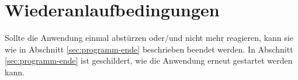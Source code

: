 
\section{Wiederanlaufbedingungen}
\label{sec:wiederanlaufbedingungen}

Sollte die Anwendung einmal abstürzen oder/und nicht mehr reagieren, kann sie wie in Abschnitt \ref{sec:programm-ende} beschrieben beendet werden.
In Abschnitt \ref{sec:programm-ende} ist geschildert, wie die Anwendung erneut gestartet werden kann.
